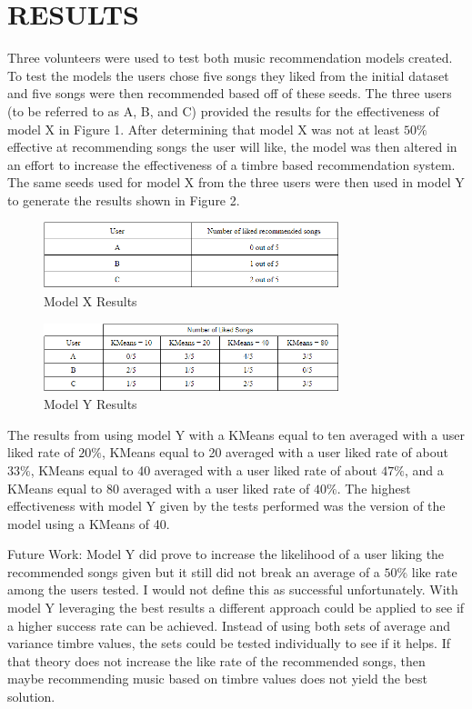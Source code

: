 \documentclass[letterpaper, 10 pt, conference]{ieeeconf}
\begin{document}
\section{RESULTS}
Three volunteers were used to test both music recommendation models created. To test the models the users chose five songs they liked from the initial dataset and five songs were then recommended based off of these seeds. The three users (to be referred to as A, B, and C) provided the results for the effectiveness of model X in Figure 1. After determining that model X was not at least $50\%$ effective at recommending songs the user will like, the model was then altered in an effort to increase the effectiveness of a timbre based recommendation system. The same seeds used for model X from the three users were then used in model Y to generate the results shown in Figure 2.

\begin{figure}[h]
        \centering
        \includegraphics[width=8.6cm]{modelX.png}
        \caption{Model X Results}
        \label{fig:ecnoc}
\end{figure}

\begin{figure}[h]
        \centering
        \includegraphics[width=8.6cm]{modelY.png}
        \caption{Model Y Results}
        \label{fig:ecnot}
\end{figure}

The results from using model Y with a KMeans equal to ten averaged with a user liked rate of $20\%$, KMeans equal to 20 averaged with a user liked rate of about $33\%$, KMeans equal to 40 averaged with a user liked rate of about $47\%$, and a KMeans equal to 80 averaged with a user liked rate of $40\%$. The highest effectiveness with model Y given by the tests performed was the version of the model using a KMeans of 40.

Future Work: Model Y did prove to increase the likelihood of a user liking the recommended songs given but it still did not break an average of a $50\%$ like rate among the users tested. I would not define this as successful unfortunately. With model Y leveraging the best results a different approach could be applied to see if a higher success rate can be achieved. Instead of using both sets of average and variance timbre values, the sets could be tested individually to see if it helps. If that theory does not increase the like rate of the recommended songs, then maybe recommending music based on timbre values does not yield the best solution.
\end{document}
